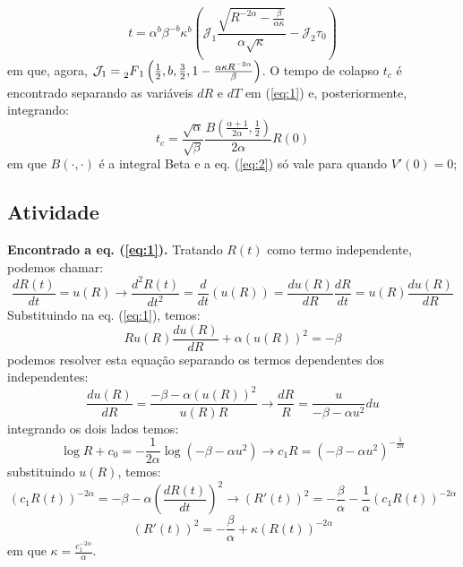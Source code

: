 \documentclass[10pt,a4paper]{article}
\begin{document}
	\[t=\alpha^b\beta^{-b}\kappa^b\left(\mathcal{J}_1\frac{\sqrt{R^{-2\alpha}-\frac{\beta}{\alpha\kappa}}}{\alpha\sqrt{\kappa}} - \mathcal{J}_2\tau_0\right)\]
	em que, agora, $\mathcal{J}_1 = \prescript{}{2}{F}_1\left(\frac{1}{2}, b, \frac{3}{2}, 1-\frac{\alpha\kappa R^{-2\alpha}}{\beta}\right)$. O tempo de colapso $t_c$ é encontrado separando as variáveis $dR$ e $dT$ em (\ref{eq:1}) e, posteriormente, integrando:
	\begin{equation}
		t_c=\frac{\sqrt{\alpha}}{\sqrt{\beta}} \frac{B\left(\frac{\alpha+1}{2\alpha},\frac{1}{2}\right)}{2\alpha} R(0)
		\label{eq:2}
	\end{equation}
    em que $B(\cdot,\cdot)$ é a integral Beta e a eq. (\ref{eq:2}) só vale para quando $V'(0)=0$;
    
    \subsection{Atividade}
    \textbf{Encontrado a eq. (\ref{eq:1}).} Tratando $R(t)$ como termo independente, podemos chamar:
    \[\frac{dR(t)}{dt} = u(R) \rightarrow \frac{d^2R(t)}{dt^2} = \frac{d}{dt}\left(u(R)\right) = \frac{du(R)}{dR}\frac{dR}{dt} = u(R)\frac{du(R)}{dR}\]
    Substituindo na eq. (\ref{eq:1}), temos:
    \[Ru(R)\frac{du(R)}{dR} + \alpha(u(R))^2 = -\beta\]
    podemos resolver esta equação separando os termos dependentes dos independentes:
    \[\frac{du(R)}{dR} = \frac{-\beta-\alpha(u(R))^2}{u(R)R} \rightarrow \frac{dR}{R} = \frac{u}{-\beta-\alpha u^2}du\]
    integrando os dois lados temos:
    \[\log{R} + c_0 = -\frac{1}{2\alpha}\log{\left(-\beta-\alpha u^2\right)} \rightarrow c_1 R = \left(-\beta-\alpha u^2\right)^{-\frac{1}{2\alpha}}\]
    substituindo $u(R)$, temos:
    \[\left(c_1 R(t)\right)^{-2\alpha} = -\beta-\alpha \left(\frac{dR(t)}{dt}\right)^2 \rightarrow (R'(t))^2 = -\frac{\beta}{\alpha} - \frac{1}{\alpha}(c_1R(t))^{-2\alpha}\]
    \[(R'(t))^2 = -\frac{\beta}{\alpha} + \kappa(R(t))^{-2\alpha}\]
    em que $\kappa = \frac{c_1^{-2\alpha}}{\alpha}$.
    
\end{document}
